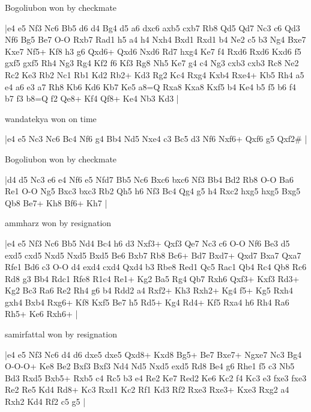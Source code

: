 \showboard

Bogoliubon won by checkmate

\makegametitle
|e4 e5 Nf3 Nc6 Bb5 d6 d4 Bg4 d5 a6 dxc6 axb5 cxb7 Rb8 Qd5 Qd7 Nc3 c6 Qd3 Nf6 Bg5 Be7 O-O Rxb7 Rad1 h5 a4 h4 Nxh4 Bxd1 Rxd1 b4 Ne2 c5 b3 Ng4 Bxe7 Kxe7 Nf5+ Kf8 h3 g6 Qxd6+ Qxd6 Nxd6 Rd7 hxg4 Ke7 f4 Rxd6 Rxd6 Kxd6 f5 gxf5 gxf5 Rh4 Ng3 Rg4 Kf2 f6 Kf3 Rg8 Nh5 Ke7 g4 c4 Ng3 cxb3 cxb3 Rc8 Ne2 Rc2 Ke3 Rb2 Nc1 Rb1 Kd2 Rb2+ Kd3 Rg2 Kc4 Rxg4 Kxb4 Rxe4+ Kb5 Rh4 a5 e4 a6 e3 a7 Rh8 Kb6 Kd6 Kb7 Ke5 a8=Q Rxa8 Kxa8 Kxf5 b4 Ke4 b5 f5 b6 f4 b7 f3 b8=Q f2 Qe8+ Kf4 Qf8+ Ke4 Nb3 Kd3  |

\showboard

wandatekya won on time

\makegametitle
|e4 e5 Nc3 Nc6 Bc4 Nf6 g4 Bb4 Nd5 Nxe4 c3 Bc5 d3 Nf6 Nxf6+ Qxf6 g5 Qxf2\#  |

\showboard

Bogoliubon won by checkmate

\makegametitle
|d4 d5 Nc3 e6 e4 Nf6 e5 Nfd7 Bb5 Nc6 Bxc6 bxc6 Nf3 Bb4 Bd2 Rb8 O-O Ba6 Re1 O-O Ng5 Bxc3 bxc3 Rb2 Qh5 h6 Nf3 Bc4 Qg4 g5 h4 Rxc2 hxg5 hxg5 Bxg5 Qb8 Be7+ Kh8 Bf6+ Kh7  |

\showboard

ammharz won by resignation

\makegametitle
|e4 e5 Nf3 Nc6 Bb5 Nd4 Bc4 h6 d3 Nxf3+ Qxf3 Qe7 Nc3 c6 O-O Nf6 Be3 d5 exd5 cxd5 Nxd5 Nxd5 Bxd5 Be6 Bxb7 Rb8 Bc6+ Bd7 Bxd7+ Qxd7 Bxa7 Qxa7 Rfe1 Bd6 c3 O-O d4 exd4 cxd4 Qxd4 b3 Rbe8 Red1 Qc5 Rac1 Qb4 Rc4 Qb8 Rc6 Rd8 g3 Bb4 Rdc1 Rfe8 R1c4 Re1+ Kg2 Ba5 Rg4 Qb7 Rxh6 Qxf3+ Kxf3 Rd3+ Kg2 Bc3 Ra6 Re2 Rh4 g6 b4 Rdd2 a4 Rxf2+ Kh3 Rxh2+ Kg4 f5+ Kg5 Rxh4 gxh4 Bxb4 Rxg6+ Kf8 Kxf5 Be7 h5 Rd5+ Kg4 Rd4+ Kf5 Rxa4 h6 Rh4 Ra6 Rh5+ Ke6 Rxh6+  |

\showboard

samirfattal won by resignation

\makegametitle
|e4 e5 Nf3 Nc6 d4 d6 dxe5 dxe5 Qxd8+ Kxd8 Bg5+ Be7 Bxe7+ Ngxe7 Nc3 Bg4 O-O-O+ Ke8 Be2 Bxf3 Bxf3 Nd4 Nd5 Nxd5 exd5 Rd8 Be4 g6 Rhe1 f5 c3 Nb5 Bd3 Rxd5 Bxb5+ Rxb5 c4 Rc5 b3 e4 Re2 Ke7 Red2 Ke6 Kc2 f4 Kc3 e3 fxe3 fxe3 Re2 Re5 Kd4 Rd8+ Kc3 Rxd1 Kc2 Rf1 Kd3 Rf2 Rxe3 Rxe3+ Kxe3 Rxg2 a4 Rxh2 Kd4 Rf2 c5 g5  |

